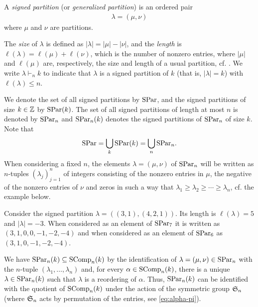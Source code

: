 \documentclass[11pt]{amsart}
\begin{document}
\begin{defin} \label{def:SPar}
    A \emph{signed partition} (or \emph{generalized partition}) is an ordered pair 
    \begin{align*}
        \lambda = (\mu, \nu) 
    \end{align*}
    where $\mu $ and $\nu$ are partitions.

    The \emph{size} of $\lambda$ is defined as $\lvert\lambda\rvert = |\mu| - |\nu|$, and the \emph{length} is $\ell(\lambda) = \ell(\mu) + \ell(\nu)$, which is the number of nonzero entries, where \(|\mu|\) and \(\ell(\mu)\) are, respectively, the size and length of a usual partition, cf. \cite[Ch.~I]{Mac15}.  We write $\lambda \vdash_n k$ to indicate that $\lambda$ is a signed partition of $k$ (that is, $|\lambda|=k$) with \(\ell(\lambda) \leq n\). 
    
    We denote the set of all signed partitions by \emph{$\mathrm{SPar}$}, and the signed partitions of size $k \in \mathbb{Z}$ by $\mathrm{SPar}(k)$. The set of all signed partitions of length at most $n$ is denoted by $\mathrm{SPar}_n$ and \(\mathrm{SPar}_n(k)\) denotes the signed partitions of \(\mathrm{SPar}_n\) of size \(k\).
    Note that 
    \begin{align*}
        \mathrm{SPar} = \bigcup_k \mathrm{SPar}(k) = \bigcup_ n \mathrm{SPar}_n.
    \end{align*}
    When considering a fixed \(n\), the elements \(\lambda = (\mu,\nu)\) of \(\mathrm{SPar}_n\) will be written as \(n\)-tuples \((\lambda_j)_{j =1}^n\) of integers consisting of the nonzero entries in \(\mu\), the negative of the nonzero entries of \(\nu\) and zeros in such a way that \(\lambda_1 \geq \lambda_2 \geq \cdots \geq \lambda_n\), cf. the example below.
\end{defin}


\begin{eg}\label{eg:SPAR}
    Consider the signed partition \(\lambda = ((3,1),(4,2,1))\).  Its length is \(\ell (\lambda) = 5\) and \(|\lambda| = -3\). When considered as an element of \(\mathrm{SPar}_7 \) it is written as \((3,1,0,0,-1,-2,-4)\) and when considered as an element of \(\mathrm{SPar}_6\) as \((3,1,0,-1,-2,-4)\).
\end{eg}

\begin{rem} \label{rem:monkey}
    We have $\mathrm{SPar}_n(k)\subseteq \mathrm{SComp}_n(k)$ by the identification of $\lambda = (\mu, \nu) \in \mathrm{SPar}_n$ with the $n$-tuple $(\lambda_1, \dots, \lambda_n)$ and, for every $\alpha \in \mathrm{SComp}_n(k)$, there is a unique $\lambda \in \mathrm{SPar}_n(k)$ such that $\lambda$ is a reordering of $\alpha$. Thus, $\mathrm{SPar}_n(k)$ can be identified with the quotient of $\mathrm{SComp}_n(k)$ under the action of the symmetric group $\mathfrak{S}_n$ (where $\mathfrak{S}_n$ acts by permutation of the entries, see \cref{eq:alpha-pi}). 
\end{rem}
\end{document}
